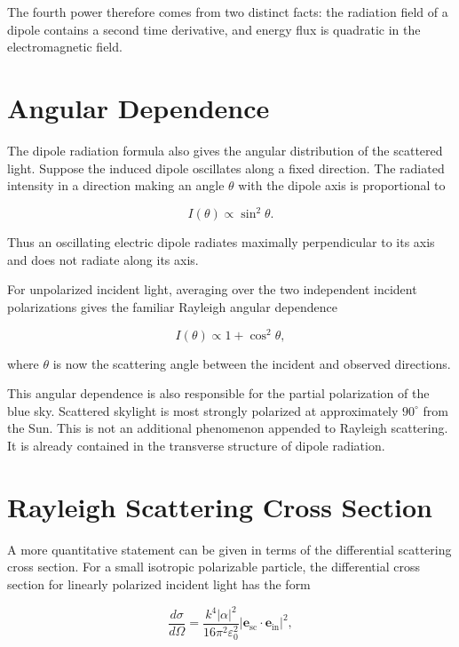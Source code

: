 \documentclass[11pt,a4paper]{article}
\begin{document}
The fourth power therefore comes from two distinct facts: the radiation field
of a dipole contains a second time derivative, and energy flux is quadratic in
the electromagnetic field.

\section{Angular Dependence}

The dipole radiation formula also gives the angular distribution of the
scattered light. Suppose the induced dipole oscillates along a fixed direction.
The radiated intensity in a direction making an angle \(\theta\) with the
dipole axis is proportional to

\begin{equation}
I(\theta) \propto \sin^2\theta.
\end{equation}

Thus an oscillating electric dipole radiates maximally perpendicular to its
axis and does not radiate along its axis.

For unpolarized incident light, averaging over the two independent incident
polarizations gives the familiar Rayleigh angular dependence

\begin{equation}
I(\theta) \propto 1+\cos^2\theta,
\end{equation}

where \(\theta\) is now the scattering angle between the incident and observed
directions.

This angular dependence is also responsible for the partial polarization of
the blue sky. Scattered skylight is most strongly polarized at approximately
\(90^\circ\) from the Sun. This is not an additional phenomenon appended to
Rayleigh scattering. It is already contained in the transverse structure of
dipole radiation.

\section{Rayleigh Scattering Cross Section}

A more quantitative statement can be given in terms of the differential
scattering cross section. For a small isotropic polarizable particle, the
differential cross section for linearly polarized incident light has the form

\begin{equation}
\frac{d\sigma}{d\Omega}
=
\frac{k^4 |\alpha|^2}{16\pi^2 \varepsilon_0^2}
\left|
\mathbf{e}_{\mathrm{sc}}\cdot \mathbf{e}_{\mathrm{in}}
\right|^2,
\end{equation}
\end{document}
